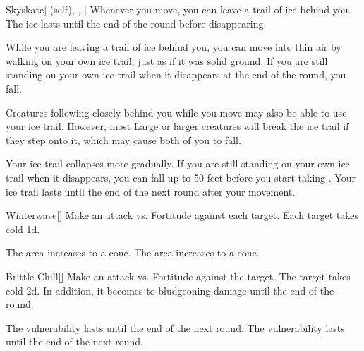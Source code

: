 \lowercase{\hypertarget{spell:Skyskate}{}}\label{spell:Skyskate}
\begin{attuneability}[Rank 3]{\hypertarget{spell:Skyskate}{Skyskate}}[ (self), , ]
Whenever you move, you can leave a trail of ice behind you.
The ice lasts until the end of the round before disappearing.

While you are leaving a trail of ice behind you, you can move into thin air by walking on your own ice trail, just as if it was solid ground.
If you are still standing on your own ice trail when it disappears at the end of the round, you fall.

Creatures following closely behind you while you move may also be able to use your ice trail.
However, most Large or larger creatures will break the ice trail if they step onto it, which may cause both of you to fall.

\rankline
{} Your ice trail collapses more gradually.  If you are still standing on your own ice trail when it disappears, you can fall up to 50 feet before you start taking .
 Your ice trail lasts until the end of the next round after your movement.

\end{attuneability}
\vspace{0.25em}



\lowercase{\hypertarget{spell:Winterwave}{}}\label{spell:Winterwave}
\begin{freeability}[Rank 3]{\hypertarget{spell:Winterwave}{Winterwave}}[]
Make an attack vs. Fortitude against each target.
\hit Each target takes cold  \minus1d.

\rankline
{} The area increases to a \areahuge cone.
 The area increases to a \areaext cone.

\end{freeability}
\vspace{0.25em}



\lowercase{\hypertarget{spell:Brittle Chill}{}}\label{spell:Brittle Chill}
\begin{freeability}[Rank 4]{\hypertarget{spell:Brittle Chill}{Brittle Chill}}[]
Make an attack vs. Fortitude against the target.
\hit The target takes cold  \minus2d.
In addition, it becomes  to bludgeoning damage until the end of the round.

\rankline
{} The vulnerability lasts until the end of the next round.
 The vulnerability lasts until the end of the next round.

\end{freeability}
\vspace{0.25em}



